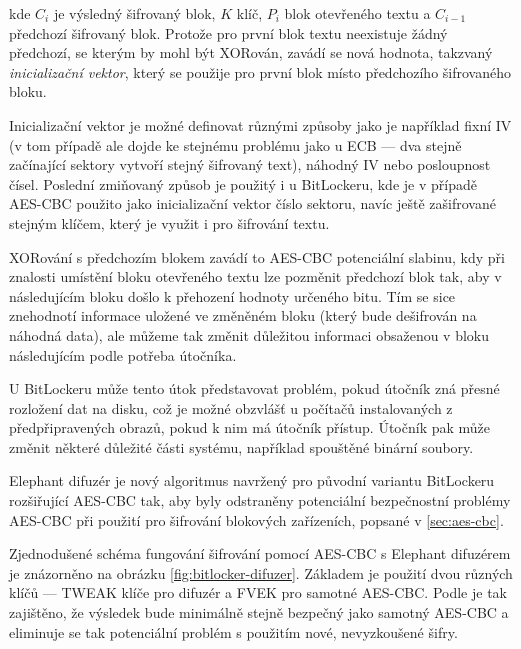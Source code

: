 kde $C_i$ je výsledný šifrovaný blok, $K$ klíč, $P_i$ blok otevřeného textu a $C_{i-1}$ předchozí šifrovaný blok. Protože pro první blok textu neexistuje žádný předchozí, se kterým by mohl být XORován, zavádí se nová hodnota, takzvaný \emph{inicializační vektor}, který se použije pro první blok místo předchozího šifrovaného bloku.\cite{Kohnoc2010}


Inicializační vektor je možné definovat různými způsoby jako je například fixní IV (v tom případě ale dojde ke stejnému problému jako u ECB --- dva stejně začínající sektory vytvoří stejný šifrovaný text), náhodný IV nebo posloupnost čísel.\cite{Kohnoc2010} Poslední zmiňovaný způsob je použitý i u BitLockeru, kde je v případě AES-CBC použito jako inicializační vektor číslo sektoru, navíc ještě zašifrované stejným klíčem, který je využit i pro šifrování textu.

XORování s předchozím blokem zavádí to AES-CBC potenciální slabinu, kdy při znalosti umístění bloku otevřeného textu lze pozměnit předchozí blok tak, aby v následujícím bloku došlo k přehození hodnoty určeného bitu. Tím se sice znehodnotí informace uložené ve změněném bloku (který bude dešifrován na náhodná data), ale můžeme tak změnit důležitou informaci obsaženou v bloku následujícím podle potřeba útočníka.\cite{Regalado2013}

U BitLockeru může tento útok představovat problém, pokud útočník zná přesné rozložení dat na disku, což je možné obzvlášť u počítačů instalovaných z předpřipravených obrazů, pokud k nim má útočník přístup. Útočník pak může změnit některé důležité části systému, například spouštěné binární soubory.\cite{Ferguson2006}\cite{Rosendorf2013}


Elephant difuzér je nový algoritmus navržený pro původní variantu BitLockeru rozšiřující AES-CBC tak, aby byly odstraněny potenciální bezpečnostní problémy AES-CBC při použití pro šifrování blokových zařízeních, popsané v \ref{sec:aes-cbc}\cite{Ferguson2006}.


Zjednodušené schéma fungování šifrování pomocí AES-CBC s Elephant difuzérem je znázorněno na obrázku \ref{fig:bitlocker-difuzer}. Základem je použití dvou různých klíčů --- TWEAK klíče pro difuzér a FVEK pro samotné AES-CBC. Podle \cite{Ferguson2006} je tak zajištěno, že výsledek bude minimálně stejně bezpečný jako samotný AES-CBC a eliminuje se tak potenciální problém s použitím nové, nevyzkoušené šifry.

